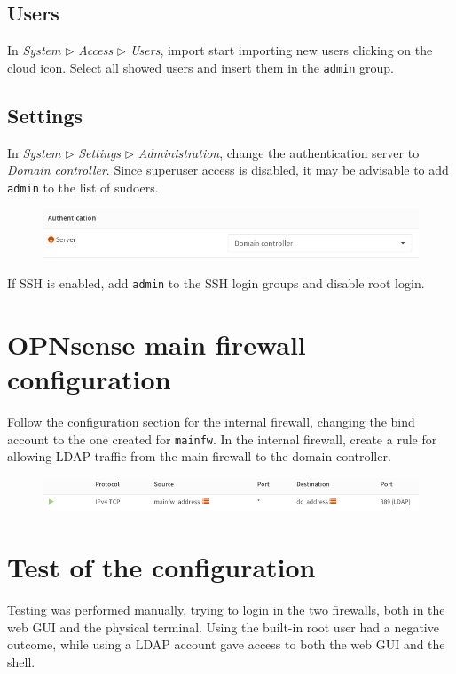 \documentclass{homework}
\newcommand{\opn}{OPNsense\xspace}
\begin{document}
    \subsection{Users}
    In \textit{System} $\triangleright$ \textit{Access} $\triangleright$ \textit{Users}, import start importing new users clicking on the cloud icon.
    Select all showed users and insert them in the \texttt{admin} group.
    
    \subsection{Settings}
    In \textit{System} $\triangleright$ \textit{Settings} $\triangleright$ \textit{Administration}, change the authentication server to \textit{Domain controller}.
    Since superuser access is disabled, it may be advisable to add \texttt{admin} to the list of sudoers.
    \begin{figure}[H]
        \centering
        \includegraphics[width=\linewidth]{images/settings}
        \label{fig:settings}
    \end{figure}
    \vspace{-10pt}
    
    If SSH is enabled, add \texttt{admin} to the SSH login groups and disable root login.
    
    
    \section{\opn main firewall configuration}
    Follow the configuration section for the internal firewall, changing the bind account to the one created for \texttt{mainfw}.
    In the internal firewall, create a rule for allowing LDAP traffic from the main firewall to the domain controller.
    \begin{figure}[H]
        \centering
        \includegraphics[width=\linewidth]{images/rule}
        \label{fig:rule}
    \end{figure}
    \vspace{-25pt}
    
    
    \section{Test of the configuration}
    Testing was performed manually, trying to login in the two firewalls, both in the web GUI and the physical terminal.
    Using the built-in root user had a negative outcome, while using a LDAP account gave access to both the web GUI and the shell.
    
\end{document}
